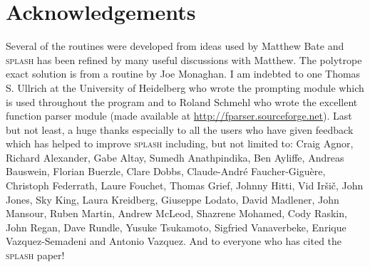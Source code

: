 \documentclass[a4paper,10pt]{article}
\newcommand{\splash}{\textsc{splash }}
\begin{document}
\section*{Acknowledgements}%
 Several of the routines were developed from ideas used by Matthew Bate and \splash has been refined by many useful discussions with Matthew. The
polytrope exact solution is from a routine by Joe Monaghan. I am indebted to one Thomas S. Ullrich at the University of Heidelberg who wrote the prompting module
which is used throughout the program and to Roland Schmehl who wrote the excellent function parser module (made available at \url{http://fparser.sourceforge.net}). Last but not least, a huge thanks especially to all the users who have given feedback which has helped to improve \splash including, but not limited to: 
 Craig Agnor,
 Richard Alexander, 
 Gabe Altay,
 Sumedh Anathpindika,
 Ben Ayliffe,
 Andreas Bauswein,
 Florian Buerzle,
 Clare Dobbs,
 Claude-Andr\'e Faucher-Gigu\`ere,
 Christoph Federrath,
 Laure Fouchet,
 Thomas Grief,
 Johnny Hitti,
 Vid Ir\v{s}i\v{c},
 John Jones,
 Sky King,
 Laura Kreidberg,
 Giuseppe Lodato,
 David Madlener,
 John Mansour,
 Ruben Martin,
 Andrew McLeod,
 Shazrene Mohamed,
 Cody Raskin,
 John Regan,
 Dave Rundle,
 Yusuke Tsukamoto,
 Sigfried Vanaverbeke,
 Enrique Vazquez-Semadeni
 and Antonio Vazquez.
And to everyone who has cited the \splash paper!

\newpage
\appendix
\end{document}
